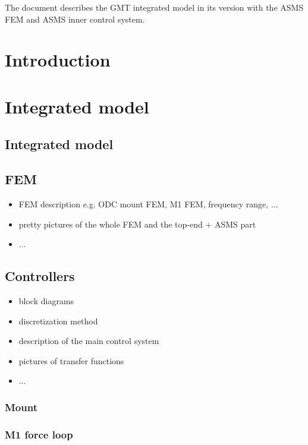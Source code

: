 \documentclass{gmto}
\begin{document}
The document describes the GMT integrated model in its version with the ASMS FEM
and ASMS inner control system.

\section{Introduction}
\label{sec:introduction}

\section{Integrated model}

\subsection{Integrated model}
\label{sec:im}

\subsection{FEM}
\label{sec:fem}

\begin{itemize}
\item FEM description e.g. ODC mount FEM, M1 FEM, frequency range, ...
\item pretty pictures of the whole FEM and the top-end + ASMS part
\item ...
\end{itemize}

\subsection{Controllers}
\label{sec:ctrlr}

\begin{itemize}
\item block diagrams
\item discretization method 
\item description of the main control system
\item pictures of transfer functions
\item ...
\end{itemize}

\subsubsection{Mount}
\label{sec:mount-ctrlr}

\subsubsection{M1 force loop}
\label{sec:m1-ctrlr}
\end{document}
